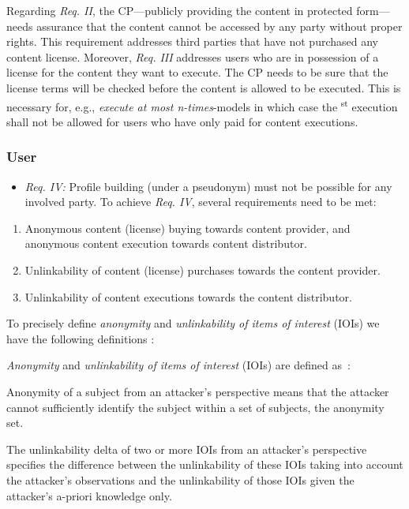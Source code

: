 \documentclass{llncs}
\begin{document}
Regarding \emph{Req. II}, the CP---publicly providing the content in protected form---needs assurance that the content cannot be accessed by any party without proper rights. This requirement addresses third parties that have not purchased any content license. Moreover, \emph{Req. III} addresses users who are in possession of a license for the content they want to execute. The CP needs to be sure that the license terms will be checked before the content is allowed to be executed. This is necessary for, e.g., \emph{execute at most n-times}-models in which case the \textsuperscript{st} execution shall not be allowed for users who have only paid for  content executions.


\subsubsection{User}

\begin{itemize}
\item \emph{Req. IV:} Profile building (under a pseudonym) must not be possible for any involved party. To achieve \emph{Req. IV}, several requirements need to be met:
\end{itemize}


\begin{enumerate}
\item Anonymous content (license) buying towards content provider, and anonymous content execution towards content distributor. 
\item Unlinkability of content (license) purchases towards the content provider. \item Unlinkability of content executions towards the content distributor. \end{enumerate}


To precisely define \emph{anonymity} and \emph{unlinkability of items of interest} (IOIs) we have the following definitions \cite{unlinkability}:

\emph{Anonymity} and \emph{unlinkability of items of interest} (IOIs) are defined as~\cite{unlinkability}:

\begin{definition}[Anonymity]
Anonymity of a subject from an attacker's perspective means that the attacker cannot sufficiently identify the subject within a set of subjects, the anonymity set.
\end{definition}

\begin{definition}
The unlinkability delta of two or more IOIs from an attacker's perspective specifies the difference between the unlinkability of these IOIs taking into account the attacker's observations and the unlinkability of those IOIs given the attacker's a-priori knowledge only.
\end{definition}
\end{document}
